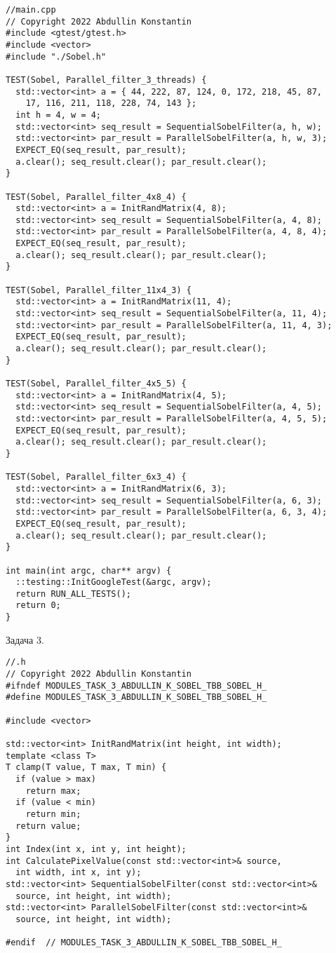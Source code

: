 \documentclass[12pt]{article}
\begin{document}
\begin{lstlisting}
//main.cpp
// Copyright 2022 Abdullin Konstantin
#include <gtest/gtest.h>
#include <vector>
#include "./Sobel.h"

TEST(Sobel, Parallel_filter_3_threads) {
  std::vector<int> a = { 44, 222, 87, 124, 0, 172, 218, 45, 87,
    17, 116, 211, 118, 228, 74, 143 };
  int h = 4, w = 4;
  std::vector<int> seq_result = SequentialSobelFilter(a, h, w);
  std::vector<int> par_result = ParallelSobelFilter(a, h, w, 3);
  EXPECT_EQ(seq_result, par_result);
  a.clear(); seq_result.clear(); par_result.clear();
}

TEST(Sobel, Parallel_filter_4x8_4) {
  std::vector<int> a = InitRandMatrix(4, 8);
  std::vector<int> seq_result = SequentialSobelFilter(a, 4, 8);
  std::vector<int> par_result = ParallelSobelFilter(a, 4, 8, 4);
  EXPECT_EQ(seq_result, par_result);
  a.clear(); seq_result.clear(); par_result.clear();
}

TEST(Sobel, Parallel_filter_11x4_3) {
  std::vector<int> a = InitRandMatrix(11, 4);
  std::vector<int> seq_result = SequentialSobelFilter(a, 11, 4);
  std::vector<int> par_result = ParallelSobelFilter(a, 11, 4, 3);
  EXPECT_EQ(seq_result, par_result);
  a.clear(); seq_result.clear(); par_result.clear();
}

TEST(Sobel, Parallel_filter_4x5_5) {
  std::vector<int> a = InitRandMatrix(4, 5);
  std::vector<int> seq_result = SequentialSobelFilter(a, 4, 5);
  std::vector<int> par_result = ParallelSobelFilter(a, 4, 5, 5);
  EXPECT_EQ(seq_result, par_result);
  a.clear(); seq_result.clear(); par_result.clear();
}

TEST(Sobel, Parallel_filter_6x3_4) {
  std::vector<int> a = InitRandMatrix(6, 3);
  std::vector<int> seq_result = SequentialSobelFilter(a, 6, 3);
  std::vector<int> par_result = ParallelSobelFilter(a, 6, 3, 4);
  EXPECT_EQ(seq_result, par_result);
  a.clear(); seq_result.clear(); par_result.clear();
}

int main(int argc, char** argv) {
  ::testing::InitGoogleTest(&argc, argv);
  return RUN_ALL_TESTS();
  return 0;
}
\end{lstlisting}
Задача 3.
\begin{lstlisting}
//.h
// Copyright 2022 Abdullin Konstantin
#ifndef MODULES_TASK_3_ABDULLIN_K_SOBEL_TBB_SOBEL_H_
#define MODULES_TASK_3_ABDULLIN_K_SOBEL_TBB_SOBEL_H_

#include <vector>

std::vector<int> InitRandMatrix(int height, int width);
template <class T>
T clamp(T value, T max, T min) {
  if (value > max)
    return max;
  if (value < min)
    return min;
  return value;
}
int Index(int x, int y, int height);
int CalculatePixelValue(const std::vector<int>& source,
  int width, int x, int y);
std::vector<int> SequentialSobelFilter(const std::vector<int>&
  source, int height, int width);
std::vector<int> ParallelSobelFilter(const std::vector<int>&
  source, int height, int width);

#endif  // MODULES_TASK_3_ABDULLIN_K_SOBEL_TBB_SOBEL_H_
\end{lstlisting}
\end{document}

